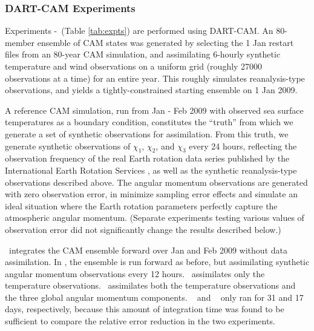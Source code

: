 
\subsubsection{DART-CAM Experiments}
Experiments \NODA-\ERPRST ~(Table \ref{tab:expts}) are performed using DART-CAM.  
An 80-member ensemble of CAM states was generated by selecting the 1 Jan restart files from an 80-year CAM simulation, and assimilating 6-hourly synthetic temperature and wind observations on a uniform grid (roughly 27000 observations at a time) for an entire year. 
This roughly simulates reanalysis-type observations, and yields a tightly-constrained starting ensemble on 1 Jan 2009.  

A reference CAM simulation, run from Jan - Feb 2009 with observed sea surface temperatures as a boundary condition, constitutes the ``truth'' from which we generate a set of synthetic observations for assimilation. 
From this truth, we generate synthetic observations of $\chi_1$, $\chi_2$, and $\chi_3$ every 24 hours, reflecting the observation frequency of the real Earth rotation data series published by the International Earth Rotation Services \citep{iers}, as well as the synthetic reanalysis-type observations described above. 
The angular momentum observations are generated with zero observation error, in minimize sampling error effects and simulate an ideal situation where the Earth rotation parameters perfectly capture the atmospheric angular momentum. 
(Separate experiments testing various values of observation error did not significantly change the results described below.)  

\NODA ~integrates the CAM ensemble forward over Jan and Feb 2009 without data assimilation. 
In \ERPALL, the ensemble is run forward as before, but assimilating synthetic angular momentum observations every 12 hours.
\RST ~assimilates only the temperature observations.
\ERPRST ~assimilates both the temperature observations and the three global angular momentum components.
\RST~ and \ERPRST~ only ran for 31 and 17 days, respectively, because this amount of integration time was found to be sufficient to compare the relative error reduction in the two experiments. 
